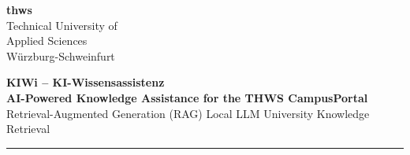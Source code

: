 \documentclass[final]{article}
\begin{document}
\fontsize{8.5}{10.5}\selectfont
\noindent\begin{minipage}[t][\dimexpr\textheight-10pt\relax][s]{\textwidth}
\color{KIWiText}

\begin{minipage}[c]{0.20\textwidth}
  {\fontsize{22}{24}\selectfont\bfseries\color{KIWiOrange} thws}\\[1mm]
  {\fontsize{6}{7}\selectfont\color{KIWiDark}Technical University of\\Applied Sciences\\Würzburg-Schweinfurt}
\end{minipage}
\hfill
\begin{minipage}[c]{0.77\textwidth}
  \centering
  {\fontsize{23}{26}\selectfont\bfseries\color{KIWiDark} KIWi -- KI-Wissensassistenz}\\[2mm]
  {\fontsize{11}{14}\selectfont\bfseries\color{KIWiNavy}
  AI-Powered Knowledge Assistance for the THWS CampusPortal}\\[2mm]
  {\fontsize{7}{9}\selectfont\color{KIWiGrey}
  Retrieval-Augmented Generation (RAG)
  \quad\textbar\quad Local LLM
  \quad\textbar\quad University Knowledge Retrieval}
\end{minipage}

\vspace{1mm}
{\color{KIWiOrange}\rule{\textwidth}{2.2pt}}


\end{minipage}
\end{document}
